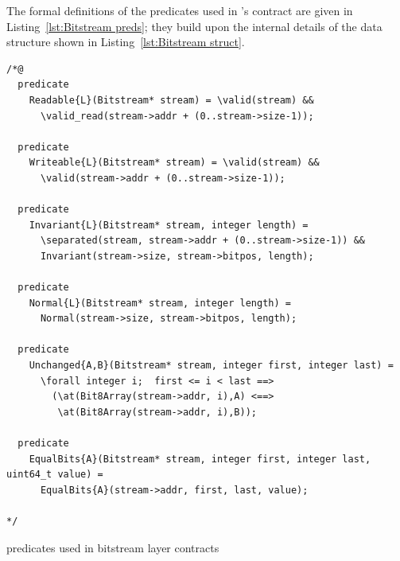 The formal definitions of the \acsl predicates used
in 's contract are given in
Listing~\ref{lst:Bitstream preds}; they build upon the internal
details of the  data structure shown in
Listing~\ref{lst:Bitstream struct}.



\begin{listing}[hbt]
\begin{minipage}{0.99\textwidth}
\begin{lstlisting}[style=acsl-block]
/*@
  predicate 
    Readable{L}(Bitstream* stream) = \valid(stream) &&
      \valid_read(stream->addr + (0..stream->size-1));

  predicate
    Writeable{L}(Bitstream* stream) = \valid(stream) &&
      \valid(stream->addr + (0..stream->size-1));

  predicate
    Invariant{L}(Bitstream* stream, integer length) =
      \separated(stream, stream->addr + (0..stream->size-1)) &&
      Invariant(stream->size, stream->bitpos, length);

  predicate
    Normal{L}(Bitstream* stream, integer length) =
      Normal(stream->size, stream->bitpos, length);

  predicate
    Unchanged{A,B}(Bitstream* stream, integer first, integer last) =
      \forall integer i;  first <= i < last ==>
        (\at(Bit8Array(stream->addr, i),A) <==>
         \at(Bit8Array(stream->addr, i),B));

  predicate
    EqualBits{A}(Bitstream* stream, integer first, integer last, uint64_t value) =
      EqualBits{A}(stream->addr, first, last, value);

*/
\end{lstlisting}
\end{minipage}
\caption{\label{lst:Bitstream preds}
	\acsl predicates used in bitstream layer contracts}
\end{listing}

\FloatBarrier

